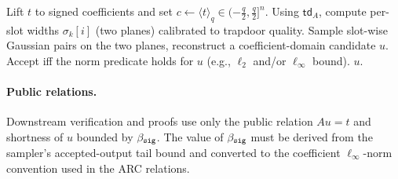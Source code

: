 \begin{algorithm}[H]
\caption{\(\SampPre(\mathsf{td}_A,t)\): two-plane hybrid sampler (sketch)}
\label{alg:samppre}
\begin{algorithmic}[1]
\State Lift \(t\) to signed coefficients and set \(c \gets \langle t\rangle_q\in(-\frac{q}{2},\frac{q}{2}]^n\).
\State Using \(\mathsf{td}_A\), compute per-slot widths \(\sigma_k[i]\) (two planes) calibrated to trapdoor quality.
\Repeat
  \State Sample slot-wise Gaussian pairs on the two planes, reconstruct a coefficient-domain candidate \(u\).
  \State Accept iff the norm predicate holds for \(u\) (e.g., \(\ell_2\) and/or \(\ell_\infty\) bound).
\State \Return \(u\).
\end{algorithmic}
\end{algorithm}

\paragraph{Public relations.}
Downstream verification and proofs use only the public relation \(A u=t\) and shortness of \(u\) bounded by
\(\beta_{\mathtt{sig}}\).  The value of \(\beta_{\mathtt{sig}}\) must be derived from the sampler's accepted-output tail bound and
converted to the coefficient \(\ell_\infty\)-norm convention used in the ARC relations.
